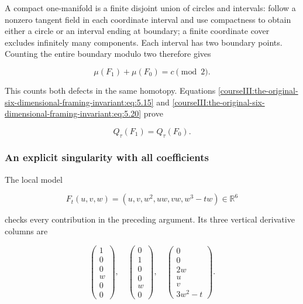 A compact one-manifold is a finite disjoint union of circles and intervals: follow a nonzero tangent field in each coordinate interval and use compactness to obtain either a circle or an interval ending at boundary; a finite coordinate cover excludes infinitely many components. Each interval has two boundary points. Counting the entire boundary modulo two therefore gives

\begin{equation}
\mu(F_1)+\mu(F_0)=c\pmod2.
 \label{courseIII:the-original-six-dimensional-framing-invariant:eq:5.20}
\end{equation}

This counts both defects in the same homotopy. Equations \eqref{courseIII:the-original-six-dimensional-framing-invariant:eq:5.15} and \eqref{courseIII:the-original-six-dimensional-framing-invariant:eq:5.20} prove

\begin{equation}
Q_\tau(F_1)=Q_\tau(F_0).
 \label{courseIII:the-original-six-dimensional-framing-invariant:eq:5.21}
\end{equation}

\subsubsection{An explicit singularity with all coefficients}
\label{courseIII:the-original-six-dimensional-framing-invariant:section-5.5}

The local model

\begin{equation}
F_t(u,v,w)=
        (u,v,w^2,uw,vw,w^3-tw)
                 \in\mathbb R^6
 \label{courseIII:the-original-six-dimensional-framing-invariant:eq:5.22}
\end{equation}

checks every contribution in the preceding argument. Its three vertical derivative columns are

\begin{equation}
\begin{pmatrix}1\\0\\0\\w\\0\\0\end{pmatrix},
 \quad
 \begin{pmatrix}0\\1\\0\\0\\w\\0\end{pmatrix},
 \quad
 \begin{pmatrix}0\\0\\2w\\u\\v\\3w^2-t\end{pmatrix}.
 \label{courseIII:the-original-six-dimensional-framing-invariant:eq:5.23}
\end{equation}

